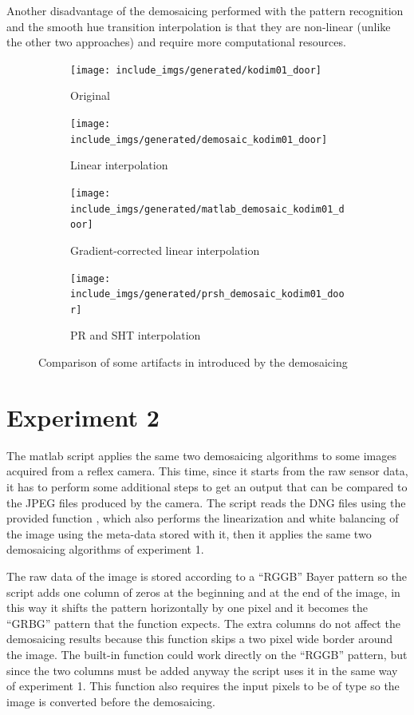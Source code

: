 \documentclass[a4paper,oneside]{article}
\begin{document}
Another disadvantage of the demosaicing performed with the pattern
recognition and the smooth hue transition interpolation is that they
are non-linear (unlike the other two approaches) and require more
computational resources.
\begin{figure}[htbp]
  \centering
  \begin{subfigure}{0.4\textwidth}
    \centering
    \texttt{[image: include\_imgs/generated/kodim01\_door]}
    \caption{Original}
  \end{subfigure}%
  \begin{subfigure}{0.4\textwidth}
    \centering
    \texttt{[image: include\_imgs/generated/demosaic\_kodim01\_door]}
    \caption{Linear interpolation}
  \end{subfigure}
  \begin{subfigure}{0.4\textwidth}
    \centering
    \texttt{[image: include\_imgs/generated/matlab\_demosaic\_kodim01\_door]}
    \caption{Gradient-corrected linear interpolation}
  \end{subfigure}%
  \begin{subfigure}{0.4\textwidth}
    \centering
    \texttt{[image: include\_imgs/generated/prsh\_demosaic\_kodim01\_door]}
    \caption{PR and SHT interpolation}
  \end{subfigure}
  \caption{Comparison of some artifacts in 
    introduced by the demosaicing}
  \label{fig:door}
\end{figure}

\section*{Experiment 2} 
The matlab script  applies the same two demosaicing
algorithms to some images acquired from a reflex camera. This time,
since it starts from the raw sensor data, it has to perform some
additional steps to get an output that can be compared to the JPEG
files produced by the camera. The script reads the DNG files using the
provided function , which also performs the
linearization and white balancing of the image using the meta-data
stored with it, then it applies the same two demosaicing algorithms
of experiment 1.

The raw data of the image is stored according to a ``RGGB'' Bayer
pattern so the script adds one column of zeros at the beginning and at
the end of the image, in this way it shifts the pattern horizontally
by one pixel and it becomes the ``GRBG'' pattern that the function
 expects. The extra columns do not affect
the demosaicing results because this function skips a two pixel wide
border around the image.  The built-in  function
could work directly on the ``RGGB'' pattern, but since the two columns
must be added anyway the script uses it in the same way of experiment
1. This function also requires the input pixels to be of type
 so the image is converted before the demosaicing.
\end{document}
